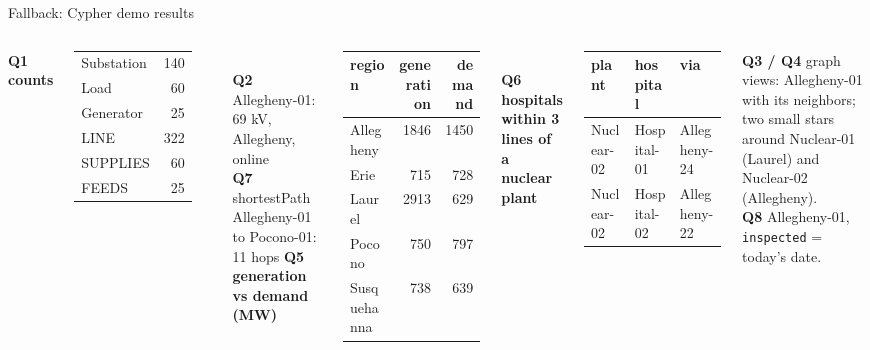 \documentclass[aspectratio=169, 10pt]{beamer}
\begin{document}
\begin{frame}[fragile]{Fallback: Cypher demo results}
  \vspace{0.1cm}
  \scriptsize
  \begin{columns}[T]
      \textbf{Q1 counts}\\[2pt]
      \begin{tabular}{@{}lr@{}}\toprule
        Substation & 140\\ Load & 60\\ Generator & 25\\ \midrule
        LINE & 322\\ SUPPLIES & 60\\ FEEDS & 25\\ \bottomrule
      \end{tabular}\\[8pt]
      \textbf{Q2} Allegheny-01: 69 kV, Allegheny, online\\[8pt]
      \textbf{Q7} shortestPath Allegheny-01 to Pocono-01: 11 hops
      \textbf{Q5 generation vs demand (MW)}\\[2pt]
      \begin{tabular}{@{}lrr@{}}\toprule
        region & generation & demand\\ \midrule
        Allegheny & 1846 & 1450\\ Erie & 715 & 728\\ Laurel & 2913 & 629\\ Pocono & 750 & 797\\ Susquehanna & 738 & 639\\ \bottomrule
      \end{tabular}\\[8pt]
      \textbf{Q6 hospitals within 3 lines of a nuclear plant}\\[2pt]
      \begin{tabular}{@{}lll@{}}\toprule
        plant & hospital & via\\ \midrule
        Nuclear-02 & Hospital-01 & Allegheny-24\\
        Nuclear-02 & Hospital-02 & Allegheny-22\\ \bottomrule
      \end{tabular}
      \textbf{Q3 / Q4} graph views: Allegheny-01 with its neighbors; two small stars around Nuclear-01 (Laurel) and Nuclear-02 (Allegheny).\\[8pt]
      \textbf{Q8} Allegheny-01, \texttt{inspected} = today's date.
  \end{columns}
\end{frame}
\end{document}
